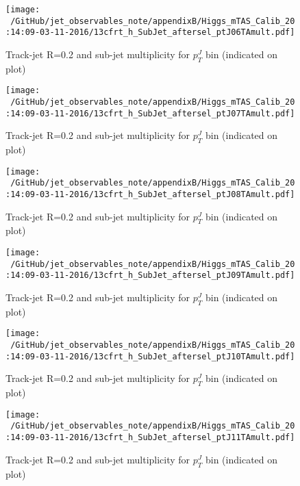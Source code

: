 \begin{figure}
 
\texttt{[image: ~/GitHub/jet\_observables\_note/appendixB/Higgs\_mTAS\_Calib\_20:14:09-03-11-2016/13cfrt\_h\_SubJet\_aftersel\_ptJ06TAmult.pdf]}
\caption{Track-jet R=0.2 and sub-jet multiplicity for $p_{T}^{J}$ bin (indicated on plot) }
 
\end{figure}
\begin{figure}
 
\texttt{[image: ~/GitHub/jet\_observables\_note/appendixB/Higgs\_mTAS\_Calib\_20:14:09-03-11-2016/13cfrt\_h\_SubJet\_aftersel\_ptJ07TAmult.pdf]}
\caption{Track-jet R=0.2 and sub-jet multiplicity for $p_{T}^{J}$ bin (indicated on plot) }
 
\end{figure}
 
\begin{figure}
 
\texttt{[image: ~/GitHub/jet\_observables\_note/appendixB/Higgs\_mTAS\_Calib\_20:14:09-03-11-2016/13cfrt\_h\_SubJet\_aftersel\_ptJ08TAmult.pdf]}
\caption{Track-jet R=0.2 and sub-jet multiplicity for $p_{T}^{J}$ bin (indicated on plot) }
 
\end{figure}

\begin{figure}

\texttt{[image: ~/GitHub/jet\_observables\_note/appendixB/Higgs\_mTAS\_Calib\_20:14:09-03-11-2016/13cfrt\_h\_SubJet\_aftersel\_ptJ09TAmult.pdf]}
\caption{Track-jet R=0.2 and sub-jet multiplicity for $p_{T}^{J}$ bin (indicated on plot) }
 
\end{figure}
 
\begin{figure}

\texttt{[image: ~/GitHub/jet\_observables\_note/appendixB/Higgs\_mTAS\_Calib\_20:14:09-03-11-2016/13cfrt\_h\_SubJet\_aftersel\_ptJ10TAmult.pdf]}
\caption{Track-jet R=0.2 and sub-jet multiplicity for $p_{T}^{J}$ bin (indicated on plot) }

\end{figure}

\begin{figure}

\texttt{[image: ~/GitHub/jet\_observables\_note/appendixB/Higgs\_mTAS\_Calib\_20:14:09-03-11-2016/13cfrt\_h\_SubJet\_aftersel\_ptJ11TAmult.pdf]}
\caption{Track-jet R=0.2 and sub-jet multiplicity for $p_{T}^{J}$ bin (indicated on plot) }

\end{figure}

